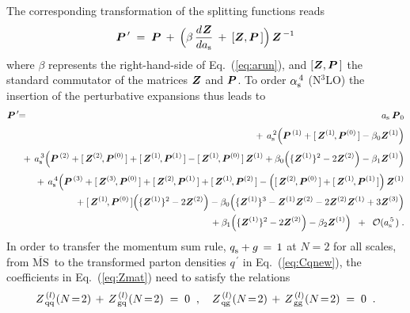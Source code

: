 \documentclass[12pt]{article}
\newcommand{\hspn}{{\hspace{-4mm}}}
\newcommand{\hspp}{{\hspace{5mm}}}
\newcommand{\beq}{\begin{equation}}
\newcommand{\eeq}{\end{equation}}
\newcommand{\bea}{\begin{eqnarray}}
\newcommand{\eea}{\end{eqnarray}}
\newcommand{\nn}{\nonumber}
\newcommand{\MSb}{$\overline{\mbox{MS}}$}
\newcommand{\as}{\alpha_{\rm s}}
\newcommand{\ar}{a_{\rm s}}
\newcommand{\PV}{\mbox{\boldmath $P$}}
\newcommand{\ZV}{\mbox{\boldmath $Z$}}
\begin{document}
The corresponding transformation of the splitting functions reads
%
\beq
\label{eq:Pnew}
 \PV^{\,\prime} \; = \; \PV \:+\: \Big( \beta\, \frac{d\:\! \ZV}{d \ar} 
 \:+\: [\ZV,\PV\,] \Big) \,\ZV^{\,-1}
\eeq
% 
where $\beta$ represents the right-hand-side of Eq.~(\ref{eq:arun}), and
$[\ZV,\PV\,]$ the standard commutator of the matrices $\ZV$ and $\PV$.
To order $\as^{\,4}$ (N$^3$LO) the insertion of the perturbative expansions 
thus leads to
%
\bea
\label{eq:Pexp}
  \PV^{\,\prime} &\!\! =\!\! & \; \ar\: \PV_0
  \nn \\[1mm] & & \mbox{\hspn}
  + \,\ar^{\,2} \Big( \PV^{\,(1)} + [\,\ZV^{(1)\!},\PV^{(0)\,}] 
    - \beta_0\ZV^{(1)} \Big)
 \nn  \\[1mm] & & \mbox{\hspn}
  + \,\ar^{\,3} \Big( \PV^{\,(2)} + [\,\ZV^{(2)\!},\PV^{(0)\,}]
    + [\,\ZV^{(1)\!},\PV^{(1)\,}] - [\,\ZV^{(1)\!},\PV^{(0)\,}] \,\ZV^{(1)}
    + \beta_0 \Big( \{\ZV^{(1)}\}^2 - 2 \ZV^{(2)} \Big) 
    - \beta_1 \ZV^{(1)} \Big)
 \nn \\[1mm] & & \mbox{\hspn}
  + \,\ar^{\,4} \Big( \PV^{\,(3)} + [\,\ZV^{(3)\!},\PV^{(0)\,}]
    + [\,\ZV^{(2)\!},\PV^{(1)\,}] + [\,\ZV^{(1)\!},\PV^{(2)\,}]
    - \Big( [\,\ZV^{(2)\!},\PV^{(0)\,}] + [\,\ZV^{(1)\!},\PV^{(1)\,}] \Big)
      \,\ZV^{(1)} 
 \nn \\ & & \mbox{\hspp}
    + [\,\ZV^{(1)\!},\PV^{(0)\,}] \Big( \{\ZV^{(1)}\}^2 - 2 \ZV^{(2)} \Big)
    - \beta_0 \Big( \{\ZV^{(1)}\}^3 - \ZV^{(1)} \ZV^{(2)} 
      - 2 \ZV^{(2)} \ZV^{(1)} +3 \ZV^{(3)}  \Big)
 \nn \\ & & \mbox{\hspp}
    + \beta_1 \Big( \{\ZV^{(1)}\}^2 - 2 \ZV^{(2)} \Big)
    - \beta_2 \ZV^{(1)} \Big) 
    \;\; + \;\; {\cal O} (\ar^{\,5\,})
 \; .
\eea
%  
In order to transfer the momentum sum rule, $q_{\rm s}^{} + g \,=\, 1$ at 
$N=2$ for all scales, from \MSb\ to the transformed parton densities 
$q^{\,\prime}$ in Eq.~(\ref{eq:Cqnew}), the coefficients in Eq.~(\ref{eq:Zmat})
need to satisfy the relations
%
\beq
\label{eq:Zmomsum}
  Z_{\,\rm qq}^{\,(l)}(N\!=\!2) \,+\, Z_{\,\rm gq}^{\,(l)}(N\!=\!2) \; = \; 0 
  \;\; , \quad
  Z_{\,\rm qg}^{\,(l)}(N\!=\!2) \,+\, Z_{\,\rm gg}^{\,(l)}(N\!=\!2) \; = \; 0
  \;\; . 
\eeq
\end{document}
